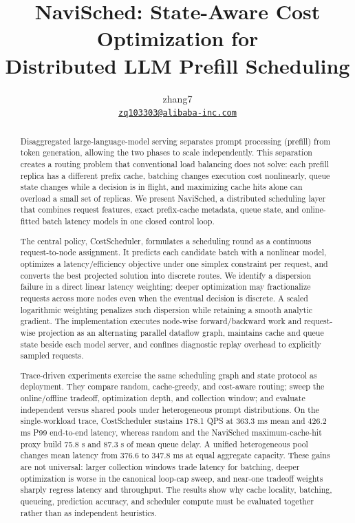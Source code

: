 \documentclass[10pt]{article}
\title{NaviSched: State-Aware Cost Optimization for\\
Distributed LLM Prefill Scheduling}
\author{zhang7\\
\href{mailto:zq103303@alibaba-inc.com}{\texttt{zq103303@alibaba-inc.com}}}
\date{}
\newcommand{\system}{NaviSched\xspace}
\newcommand{\method}{CostScheduler\xspace}
\begin{document}
\maketitle

\begin{abstract}
Disaggregated large-language-model serving separates prompt processing
(prefill) from token generation, allowing the two phases to scale
independently. This separation creates a routing problem that conventional
load balancing does not solve: each prefill replica has a different prefix
cache, batching changes execution cost nonlinearly, queue state changes while
a decision is in flight, and maximizing cache hits alone can overload a small
set of replicas. We present \system, a distributed scheduling layer that
combines request features, exact prefix-cache metadata, queue state, and
online-fitted batch latency models in one closed control loop.

The central policy, \method, formulates a scheduling round as a continuous
request-to-node assignment. It predicts each candidate batch with a nonlinear
model, optimizes a latency/efficiency objective under one simplex constraint
per request, and converts the best projected solution into discrete routes.
We identify a dispersion failure in a direct linear latency weighting: deeper
optimization may fractionalize requests across more nodes even when the
eventual decision is discrete. A scaled logarithmic weighting penalizes such
dispersion while retaining a smooth analytic gradient. The implementation
executes node-wise forward/backward work and request-wise projection as an
alternating parallel dataflow graph, maintains cache and queue state beside
each model server, and confines diagnostic replay overhead to explicitly
sampled requests.

Trace-driven experiments exercise the same scheduling graph and state
protocol as deployment. They compare random, cache-greedy, and cost-aware
routing; sweep the online/offline tradeoff, optimization depth, and collection
window; and evaluate independent versus shared pools under heterogeneous
prompt distributions. On the single-workload trace, CostScheduler sustains
178.1 QPS at 363.3 ms mean and 426.2 ms P99 end-to-end latency, whereas random
and the NaviSched maximum-cache-hit proxy build 75.8 s and 87.3 s of mean
queue delay. A unified heterogeneous pool changes mean latency from 376.6 to
347.8 ms at equal aggregate capacity. These gains are not universal: larger
collection windows trade latency for batching, deeper optimization is worse
in the canonical loop-cap sweep, and near-one tradeoff weights sharply regress
latency and throughput. The results show why cache locality, batching,
queueing, prediction accuracy, and scheduler compute must be evaluated
together rather than as independent heuristics.
\end{abstract}
\end{document}
